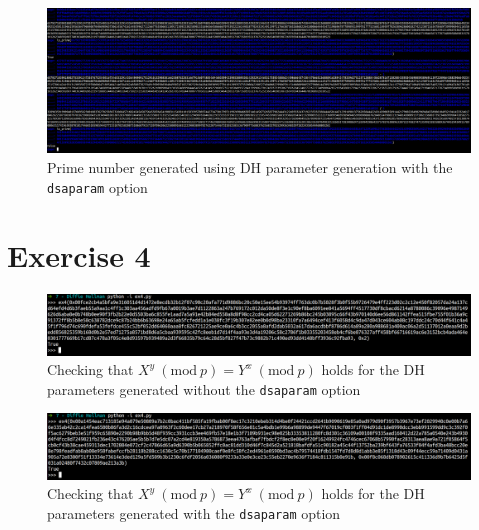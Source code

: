 \documentclass[a4paper]{article}
\begin{document}
\begin{appendices}
\begin{figure}[H]
    \centering
    \includegraphics[width=\textwidth]{img/dsa-sage.png}
    \caption{Prime number generated using DH parameter generation with the \texttt{dsaparam} option}
    \label{fig:sage-dsa}
\end{figure}

\section*{Exercise 4}

\begin{figure}[H]
    \centering
    \includegraphics[width=\textwidth]{img/dh-py.png}
    \caption{Checking that $X^y \ (\mathrm{mod} \ p) = Y^x \ (\mathrm{mod} \ p)$ holds for the DH parameters generated without the \texttt{dsaparam} option}
    \label{fig:ex4-dhparam}
\end{figure}

\begin{figure}[H]
    \centering
    \includegraphics[width=\textwidth]{img/dsa-py.png}
    \caption{Checking that $X^y \ (\mathrm{mod} \ p) = Y^x \ (\mathrm{mod} \ p)$ holds for the DH parameters generated with the \texttt{dsaparam} option}
    \label{fig:ex4-dsa}
\end{figure}

\end{appendices}
\end{document}
